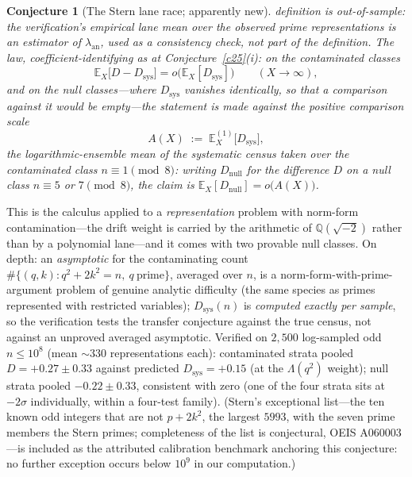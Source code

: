 \documentclass[11pt]{article}
\newtheorem{conjecture}{Conjecture}
\theoremstyle{definition}
\begin{document}
\begin{conjecture}[The Stern lane race; apparently new]
definition is out-of-sample: the verification's empirical lane mean
over the observed prime representations is an estimator of
$\lambda_{\mathrm{an}}$, used as a consistency check, not part of the
definition.  The law, coefficient-identifying as at
Conjecture~\ref{c25}(i): on the contaminated classes
\[
\mathbb E_X\bigl[D-D_{\mathrm{sys}}\bigr]
=o\bigl(\mathbb E_X[D_{\mathrm{sys}}]\bigr)
\qquad(X\to\infty),
\]
and on the null classes---where $D_{\mathrm{sys}}$ vanishes
identically, so that a comparison against it would be empty---the
statement is made against the positive comparison scale
\[
A(X)\;:=\;\mathbb E_X^{(1)}\bigl[D_{\mathrm{sys}}\bigr],
\]
the logarithmic-ensemble mean of the systematic census taken over the
\emph{contaminated} class $n\equiv1\pmod 8$: writing
$D_{\mathrm{null}}$ for the difference $D$ on a null class
$n\equiv5$ or $7\pmod 8$, the claim is
$\mathbb E_X[D_{\mathrm{null}}]=o\bigl(A(X)\bigr)$.
\end{conjecture}

This is the calculus applied to a \emph{representation} problem with
norm-form contamination---the drift weight is carried by the
arithmetic of $\mathbb Q(\sqrt{-2})$ rather than by a polynomial
lane---and it comes with two provable null classes.  On depth: an
\emph{asymptotic} for the
contaminating count $\#\{(q,k):q^2+2k^2=n,\ q\ \text{prime}\}$,
averaged over $n$, is a norm-form-with-prime-argument problem of
genuine analytic difficulty (the same species as primes represented
with restricted variables);
$D_{\mathrm{sys}}(n)$ is \emph{computed exactly per sample}, so the
verification tests the transfer conjecture against the true census,
not against an unproved averaged asymptotic.  Verified on $2{,}500$
log-sampled odd $n\le10^8$ (mean ${\sim}330$ representations each):
contaminated strata pooled $D=+0.27\pm0.33$ against predicted
$D_{\mathrm{sys}}=+0.15$ (at the $\Lambda(q^2)$ weight);
null strata pooled $-0.22\pm0.33$,
consistent with zero (one of the four strata sits at $-2\sigma$
individually, within a four-test family).  (Stern's exceptional list---the ten known odd integers that are not $p+2k^2$, the largest
$5993$, with the seven prime members the Stern primes; completeness
of the list is conjectural, OEIS A060003---is
included as the attributed calibration benchmark anchoring this
conjecture: no further exception occurs below $10^9$ in our
computation.)
\end{document}
